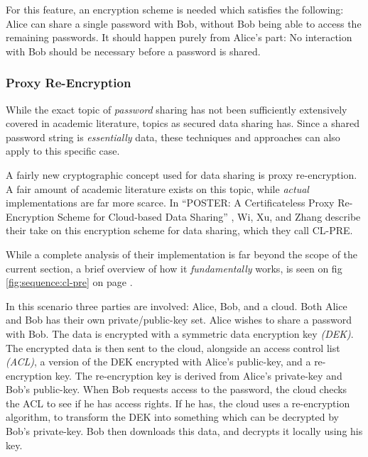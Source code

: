 			For this feature, an encryption scheme is needed which satisfies the following: Alice can share a single password with Bob, without Bob being able to access the remaining passwords. It should happen purely from Alice's part: No interaction with Bob should be necessary before a password is shared.


			\subsubsection{Proxy Re-Encryption}
				While the exact topic of \emph{password} sharing has not been sufficiently extensively covered in academic literature, topics as secured data sharing has. Since a shared password string is \emph{essentially} data, these techniques and approaches can also apply to this specific case. 

				A fairly new cryptographic concept used for data sharing is proxy re-encryption. A fair amount of academic literature exists on this topic, while \emph{actual} implementations are far more scarce. In ``POSTER: A Certificateless Proxy Re-Encryption Scheme for Cloud-based Data Sharing'' \cite{Wu:2011:PCP:2046707.2093514}, Wi, Xu, and Zhang describe their take on this encryption scheme for data sharing, which they call CL-PRE.

				While a complete analysis of their implementation is far beyond the scope of the current section, a brief overview of how it \emph{fundamentally} works, is seen on fig \ref{fig:sequence:cl-pre} on page \pageref{fig:sequence:cl-pre}.

				In this scenario three parties are involved: Alice, Bob, and a cloud. Both Alice and Bob has their own private/public-key set. Alice wishes to share a password with Bob. The data is encrypted with a symmetric data encryption key \emph{(DEK)}. The encrypted data is then sent to the cloud, alongside an access control list \emph{(ACL)}, a version of the DEK encrypted with Alice's public-key, and a re-encryption key. The re-encryption key is derived from Alice's private-key and Bob's public-key. When Bob requests access to the password, the cloud checks the ACL to see if he has access rights. If he has, the cloud uses a re-encryption algorithm, to transform the DEK into something which can be decrypted by Bob's private-key. Bob then downloads this data, and decrypts it locally using his key.


